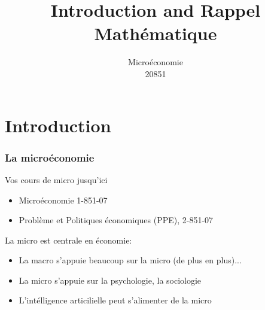 \documentclass[handout]{beamer}
\title{Introduction and Rappel Mathématique}
\author{Microéconomie \\ 20851}
\date{}
\begin{document}
\frame{\titlepage}

\section[Outline]{}
\frame{\tableofcontents}

\section{Introduction}
\frame
{
  \frametitle{La microéconomie}
Vos cours de micro jusqu'ici
  \begin{itemize}
  \item<1-> Microéconomie 1-851-07
  \item<2-> Problème et Politiques économiques (PPE), 2-851-07
  \end{itemize}
  \vspace{0.2in}
  La micro est centrale en économie: 
  \begin{itemize}
    \item<3-> La macro s'appuie beaucoup sur la micro (de plus en plus)...
    \item<4-> La micro s'appuie sur la psychologie, la sociologie
    \item<5-> L'intélligence articilielle peut s'alimenter de la micro
  \end{itemize}
}
\end{document}

